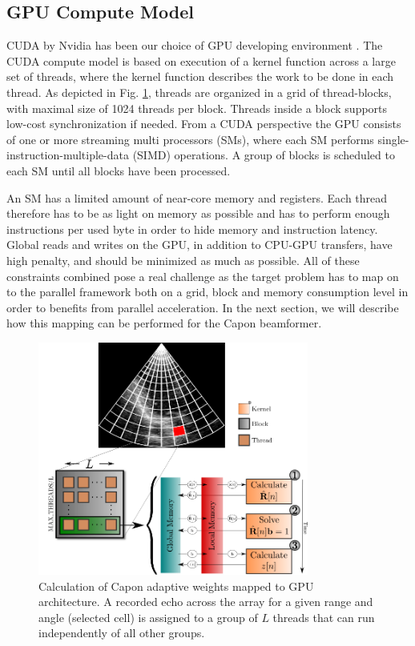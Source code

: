 \documentclass[conference]{IEEEtran}
\begin{document}
\subsection{GPU Compute Model}
CUDA by Nvidia has been our choice of GPU developing environment \cite{Nvidia2011}. The CUDA compute model is based on execution of a kernel function across a large set of threads, where the kernel function describes the work to be done in each thread. As depicted in Fig. \ref{fig:gpulayout}, threads are organized in a grid of thread-blocks, with maximal size of 1024 threads per block. Threads inside a block supports low-cost synchronization if needed. 
From a CUDA perspective the GPU consists of one or more streaming multi processors (SMs), where each SM performs single-instruction-multiple-data (SIMD) operations. A group of blocks is scheduled to each SM until all blocks have been processed. 

An SM has a limited amount of near-core memory and registers. Each thread therefore has to be as light on memory as possible and has to perform enough instructions per used byte in order to hide memory and instruction latency. Global reads and writes on the GPU, in addition to CPU-GPU transfers, have high penalty, and should be minimized as much as possible. All of these constraints combined pose a real challenge as the target problem has to map on to the parallel framework both on a grid, block and memory consumption level in order to benefits from parallel acceleration. In the next section, we will describe how this mapping can be performed for the Capon beamformer.    

\begin{figure}
\centerline{\includegraphics[width=3.5in]{gfx/gpu_layout_vertical_lr.png}}
\caption{Calculation of Capon adaptive weights mapped to GPU architecture. A recorded echo across the array for a given range and angle (selected cell) is assigned to a group of $L$ threads that can run independently of all other groups.} %
\label{fig:gpulayout}
\end{figure}
\end{document}
